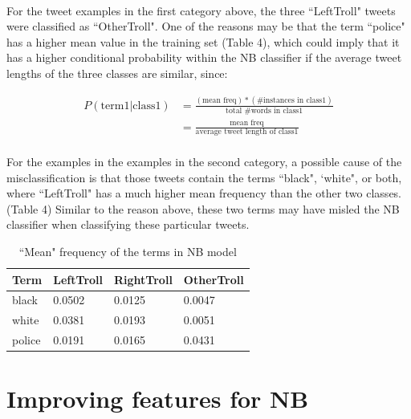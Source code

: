 \documentclass[11pt]{article}
\begin{document}
\paragraph{} For the tweet examples in the first category above, the three ``LeftTroll" tweets were classified as ``OtherTroll". One of the reasons may be that the term ``police" has a higher mean value in the training set (Table 4), which could imply that it has a higher conditional probability within the NB classifier if the average tweet lengths of the three classes are similar, since:

\begin{equation*}
\begin{split} 
P(\text{term1} | \text{class1}) &= \frac{(\text{mean freq}) * (\text{\# instances in class1})}{\text{total \# words in class1}} \\
& = \frac{\text{mean freq}}{\text{average tweet length of class1}}
\end{split}
\end{equation*}

\paragraph{} For the examples in the examples in the second category, a possible cause of the misclassification is that those tweets contain the terms ``black", `white", or both, where ``LeftTroll" has a much higher mean frequency than the other two classes. (Table 4) Similar to the reason above, these two terms may have misled the NB classifier when classifying these particular tweets.

\begin{table}[!htbp]
 \begin{center}
\begin{tabular}{| l | l | l | l |}
      \hline
      Term & LeftTroll & RightTroll & OtherTroll \\
      \hline\hline
      black & 0.0502 & 0.0125 & 0.0047 \\
      white & 0.0381 & 0.0193 & 0.0051 \\
      police & 0.0191 & 0.0165 & 0.0431 \\
      \hline
\end{tabular}
\caption{``Mean" frequency of the terms in NB model}\label{table2}
 \end{center}
\end{table}


\section{Improving features for NB}
\end{document}
